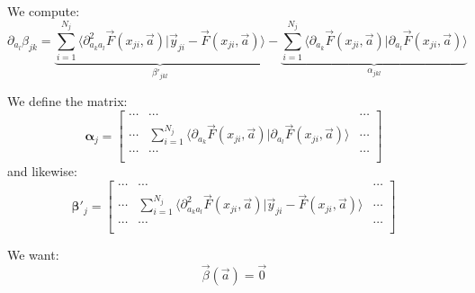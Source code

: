 \documentclass[aps,12pt]{revtex4}
\begin{document}
We compute:
\begin{equation}
\partial_{a_l} \beta_{jk} =  \underbrace{\sum_{i=1}^{N_j} 
\langle \partial^2_{a_ka_l} \vec F(x_{ji},\vec a) \vert \vec y_{ji} - \vec F(x_{ji},\vec a)\rangle 
}_{\beta'_{jkl}}
- \underbrace{\sum_{i=1}^{N_j}\langle  \partial_{a_k} \vec F(x_{ji},\vec a) \vert  \partial_{a_l} \vec F(x_{ji},\vec a) \rangle}
_{\alpha_{jkl}}
\end{equation}

We define the matrix:
\begin{equation}
	\bm \alpha_j = 
	\begin{bmatrix}
	\cdots & \cdots & \cdots \\
	\cdots & \sum_{i=1}^{N_j}\langle  \partial_{a_k} \vec F(x_{ji},\vec a) \vert  \partial_{a_l} \vec F(x_{ji},\vec a) \rangle & \cdots\\
	\cdots & \cdots & \cdots \\
	\end{bmatrix}
\end{equation}
and likewise:
\begin{equation}
	\bm \beta'_j = 
	\begin{bmatrix}
	\cdots & \cdots & \cdots \\
	\cdots & \sum_{i=1}^{N_j} \langle \partial^2_{a_ka_l} \vec F(x_{ji},\vec a) \vert \vec y_{ji} - \vec F(x_{ji},\vec a)\rangle  & \cdots\\
	\cdots & \cdots & \cdots \\
	\end{bmatrix}
\end{equation}

We want:
\begin{equation}
	\vec \beta(\vec a) = \vec 0
\end{equation}
\end{document}
